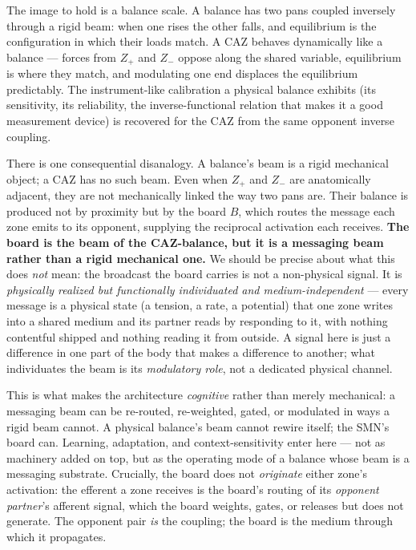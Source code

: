 \documentclass{article}
\begin{document}
The image to hold is a balance scale.  A balance has two pans coupled
inversely through a rigid beam: when one rises the other falls, and
equilibrium is the configuration in which their loads match.  A CAZ
behaves dynamically like a balance --- forces from $Z_+$ and $Z_-$
oppose along the shared variable, equilibrium is where they match, and
modulating one end displaces the equilibrium predictably.  The
instrument-like calibration a physical balance exhibits (its
sensitivity, its reliability, the inverse-functional relation that
makes it a good measurement device) is recovered for the CAZ from the
same opponent inverse coupling.

There is one consequential disanalogy.  A balance's beam is a rigid
mechanical object; a CAZ has no such beam.  Even when $Z_+$ and $Z_-$
are anatomically adjacent, they are not mechanically linked the way two
pans are.  Their balance is produced not by proximity but by the board
$B$, which routes the message each zone emits to its opponent, supplying
the reciprocal activation each receives.  \textbf{The board is the beam
of the CAZ-balance, but it is a messaging beam rather than a rigid
mechanical one.}  We should be precise about what this does \emph{not}
mean: the broadcast the board carries is not a non-physical signal.  It
is \emph{physically realized but functionally individuated and
medium-independent} --- every message is a physical state (a tension, a
rate, a potential) that one zone writes into a shared medium and its
partner reads by responding to it, with nothing contentful shipped and
nothing reading it from outside.  A signal here is just a difference in
one part of the body that makes a difference to another; what
individuates the beam is its \emph{modulatory role}, not a dedicated
physical channel.

This is what makes the architecture \emph{cognitive} rather than
merely mechanical: a messaging beam can be re-routed, re-weighted,
gated, or modulated in ways a rigid beam cannot.  A physical balance's
beam cannot rewire itself; the SMN's board can.  Learning, adaptation,
and context-sensitivity enter here --- not as machinery added on top,
but as the operating mode of a balance whose beam is a messaging
substrate.  Crucially, the board does not \emph{originate} either
zone's activation: the efferent a zone receives is the board's routing of its
\emph{opponent partner}'s afferent signal, which the board weights, gates, or
releases but does not generate.  The opponent pair \emph{is} the
coupling; the board is the medium through which it propagates.
\end{document}
